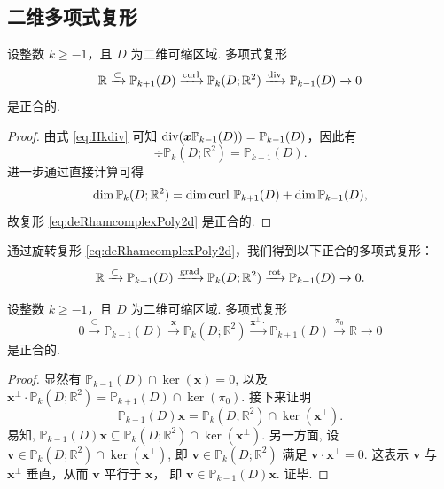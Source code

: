 \subsection{二维多项式复形}
\begin{lemma}
设整数 $k\geq-1$，且 $D$ 为二维可缩区域.
多项式复形
\begin{equation}\label{eq:deRhamcomplexPoly2d}
\mathbb R\xrightarrow{\subset} \mathbb P_{k+1}(D)\xrightarrow{\operatorname{curl}} \mathbb P_k(D;\mathbb R^2) \xrightarrow{\operatorname{div}} \mathbb P_{k-1}(D)\xrightarrow{}0
\end{equation}
是正合的.  
\end{lemma}
\begin{proof}
由式 \eqref{eq:Hkdiv} 可知
$\operatorname{div}(\boldsymbol x \mathbb P_{k-1}(D)) = \mathbb P_{k-1}(D)$，因此有
\[
\div \mathbb P_k(D;\mathbb R^2) = \mathbb P_{k-1}(D).
\]
进一步通过直接计算可得
\[
\dim\mathbb P_k(D;\mathbb R^2)=\dim \operatorname{curl} \, \mathbb P_{k+1}(D)+\dim \mathbb P_{k-1}(D),
\]
故复形 \eqref{eq:deRhamcomplexPoly2d} 是正合的.
\end{proof}

通过旋转复形 \eqref{eq:deRhamcomplexPoly2d}，我们得到以下正合的多项式复形：
\begin{equation*}
\mathbb R\xrightarrow{\subset} \mathbb P_{k+1}(D)\xrightarrow{\operatorname{grad}} \mathbb P_k(D;\mathbb R^2) \xrightarrow{\operatorname{rot}} \mathbb P_{k-1}(D)\xrightarrow{}0.
\end{equation*}


\begin{lemma}
设整数 $k\geq-1$，且 $D$ 为二维可缩区域.
多项式复形
\begin{equation}\label{eq:KoszulcomplexPoly2d}
0\xrightarrow{\subset}\mathbb P_{k-1}(D) \xrightarrow{\boldsymbol x} \mathbb P_k(D;\mathbb R^2) \xrightarrow{\boldsymbol x^{\perp}\cdot} \mathbb P_{k+1}(D)\xrightarrow{\pi_{0}}\mathbb R\xrightarrow{}0
\end{equation}
是正合的.  
\end{lemma}
\begin{proof}
显然有 $\mathbb P_{k-1}(D)\cap\ker(\boldsymbol{x})=0$, 以及 $\boldsymbol x^{\perp}\cdot\mathbb P_k(D;\mathbb R^2)=\mathbb P_{k+1}(D)\cap\ker(\pi_0)$. 接下来证明
$$
\mathbb P_{k-1}(D)\boldsymbol{x} = \mathbb P_k(D;\mathbb R^2)\cap\ker(\boldsymbol x^{\perp}).
$$ 
易知, $\mathbb P_{k-1}(D)\boldsymbol{x} \subseteq \mathbb P_k(D;\mathbb R^2)\cap\ker(\boldsymbol x^{\perp})$. 另一方面, 设 $\boldsymbol{v}\in\mathbb P_k(D;\mathbb R^2)\cap\ker(\boldsymbol x^{\perp})$, 即 $\boldsymbol{v}\in\mathbb P_k(D;\mathbb R^2)$ 满足 $\boldsymbol{v}\cdot \boldsymbol x^{\perp}=0$. 这表示 $\boldsymbol{v}$ 与 $\boldsymbol x^{\perp}$ 垂直，从而 $\boldsymbol{v}$ 平行于 $\boldsymbol{x}$， 即 $\boldsymbol{v}\in \mathbb P_{k-1}(D)\boldsymbol{x}$. 证毕.
\end{proof}

